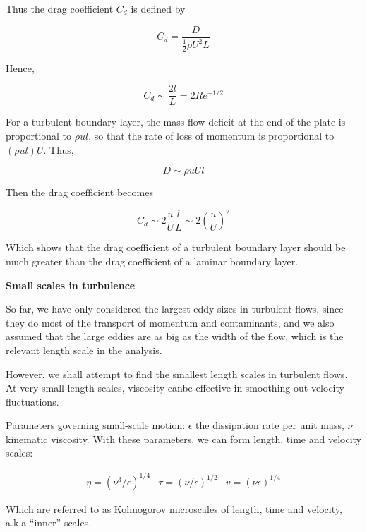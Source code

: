 \documentclass{article}
\begin{document}
Thus the drag coefficient $C_d$ is defined by 

\begin{equation*}
    C_d=\frac{D}{\frac12\rho U^2L}
\end{equation*}

Hence,

\begin{equation*}
    C_d\sim\frac{2l}{L}=2Re^{-1/2}
\end{equation*}

For a turbulent boundary layer, the mass flow deficit at the end of the plate is proportional to $\rho ul$, so that the rate of loss of momentum is proportional to $(\rho ul)U$. Thus,

\begin{equation*}
    D\sim\rho uUl
\end{equation*}

Then the drag coefficient becomes

\begin{equation*}
    C_d\sim 2\frac{u}{U}\frac{l}{L}\sim2\left(\frac{u}{U}\right)^2
\end{equation*}

Which shows that the drag coefficient of a turbulent boundary layer should be much greater than the drag coefficient of a laminar boundary layer.

\textbf{Small scales in turbulence}

So far, we have only considered the largest eddy sizes in turbulent flows, since they do most of the transport of momentum and contaminants, and we also assumed that the large eddies are as big as the width of the flow, which is the relevant length scale in the analysis.

However, we shall attempt to find the smallest length scales in turbulent flows. At very small length scales, viscosity canbe effective in smoothing out velocity fluctuations.

Parameters governing small-scale motion: $\epsilon$ the dissipation rate per unit mass, $\nu$ kinematic viscosity. With these parameters, we can form length, time and velocity scales:

\begin{align*}
    \eta=(\nu^3/\epsilon)^{1/4} &   \tau=(\nu/\epsilon)^{1/2}   &   v=(\nu\epsilon)^{1/4}
\end{align*}

Which are referred to as Kolmogorov microscales of length, time and velocity, a.k.a ``inner'' scales.
\end{document}
